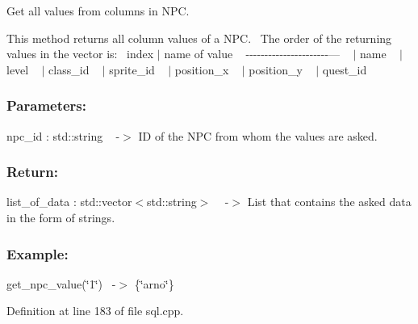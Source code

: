 Get all values from columns in N\+PC. 

This method returns all column values of a N\+PC.~\newline
 The order of the returning values in the vector is\+:~\newline
 index $\vert$ name of value ~\newline
-\/-\/-\/-\/-\/-\/-\/-\/-\/-\/-\/-\/-\/-\/-\/-\/-\/-\/-\/-\/-\/-\/--- ~ $\vert$ name ~ $\vert$ level ~ $\vert$ class\+\_\+id ~ $\vert$ sprite\+\_\+id ~ $\vert$ position\+\_\+x ~ $\vert$ position\+\_\+y ~ $\vert$ quest\+\_\+id ~\newline


\subsubsection*{Parameters\+: }

npc\+\_\+id \+: std\+::string ~\newline
-\/$>$ ID of the N\+PC from whom the values are asked.

\subsubsection*{Return\+: }

list\+\_\+of\+\_\+data \+: std\+::vector$<$std\+::string$>$ ~\newline
-\/$>$ List that contains the asked data in the form of strings.

\subsubsection*{Example\+: }

get\+\_\+npc\+\_\+value(\char`\"{}1\char`\"{})~\newline
-\/$>$ \{\char`\"{}arno\char`\"{}\} 

Definition at line 183 of file sql.\+cpp.

